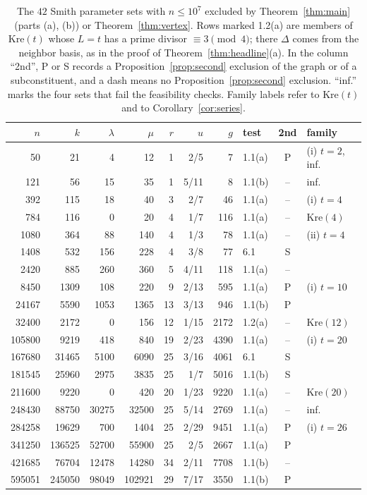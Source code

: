 \documentclass[11pt]{article}
\theoremstyle{definition}
\theoremstyle{remark}
\newcommand{\Kre}{\mathrm{Kre}}
\begin{document}
\begin{table}[H]\footnotesize\centering
\caption{The $42$ Smith parameter sets with $n\le10^7$ excluded by
Theorem~\ref{thm:main} (parts (a), (b)) or Theorem~\ref{thm:vertex}. Rows
marked 1.2(a) are members of $\Kre(t)$ whose $L=t$ has a prime divisor
$\equiv3\pmod4$; there $\Delta$ comes from the neighbor basis, as in the proof
of Theorem~\ref{thm:headline}(a). In the
column ``2nd'', P or S records a Proposition~\ref{prop:second} exclusion of the
graph or of a subconstituent, and a dash means no
Proposition~\ref{prop:second} exclusion. ``inf.'' marks the four sets that fail
the feasibility checks. Family labels refer to $\Kre(t)$ and to
Corollary~\ref{cor:series}.}\label{tab:scan}
\setlength{\tabcolsep}{4pt}
\begin{tabular}{rrrrrrrlcl}\toprule
$n$&$k$&$\lambda$&$\mu$&$r$&$u$&$g$&test&2nd&family\\\midrule
50&21&4&12&1&2/5&7&1.1(a)&P&(i) $t{=}2$, inf.\\
121&56&15&35&1&5/11&8&1.1(b)&--&inf.\\
392&115&18&40&3&2/7&46&1.1(a)&--&(i) $t{=}4$\\
784&116&0&20&4&1/7&116&1.1(a)&--&$\Kre(4)$\\
1080&364&88&140&4&1/3&78&1.1(a)&--&(ii) $t{=}4$\\
1408&532&156&228&4&3/8&77&6.1&S&\\
2420&885&260&360&5&4/11&118&1.1(a)&--&\\
8450&1309&108&220&9&2/13&595&1.1(a)&P&(i) $t{=}10$\\
24167&5590&1053&1365&13&3/13&946&1.1(b)&P&\\
32400&2172&0&156&12&1/15&2172&1.2(a)&--&$\Kre(12)$\\
105800&9219&418&840&19&2/23&4390&1.1(a)&--&(i) $t{=}20$\\
167680&31465&5100&6090&25&3/16&4061&6.1&S&\\
181545&25960&2975&3835&25&1/7&5016&1.1(b)&S&\\
211600&9220&0&420&20&1/23&9220&1.1(a)&--&$\Kre(20)$\\
248430&88750&30275&32500&25&5/14&2769&1.1(a)&--&inf.\\
284258&19629&700&1404&25&2/29&9451&1.1(a)&P&(i) $t{=}26$\\
341250&136525&52700&55900&25&2/5&2667&1.1(a)&P&\\
421685&76704&12478&14280&34&2/11&7708&1.1(b)&--&\\
595051&245050&98049&102921&29&7/17&3550&1.1(b)&P&\\

\end{tabular}
\end{table}
\end{document}
